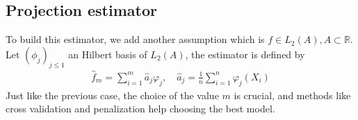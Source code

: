 \documentclass{article}
\begin{document}
\subsection{Projection estimator}
To build this estimator, we add another assumption which is \(f\in L_2(A), A\subset \mathbb{R}\). \\
Let \((\phi_j)_{j\le 1}\) an Hilbert basis of \(L_2(A)\), the estimator is defined by 
\begin{align}
    \hat{f}_m=\sum_{i=1}^m\hat{a}_j\varphi_j, \quad \hat{a}_j=\frac{1}{n}\sum_{i=1}^n \varphi_j(X_i)
\end{align}
Just like the previous case, the choice of the value \(m\) is crucial, and methods like cross validation and penalization help choosing the best model.

\nocite{Coste_2025}
\nocite{lipman2024flowmatchingguidecode}
\nocite{strasman2025analysisnoiseschedulescorebased}


\end{document}
